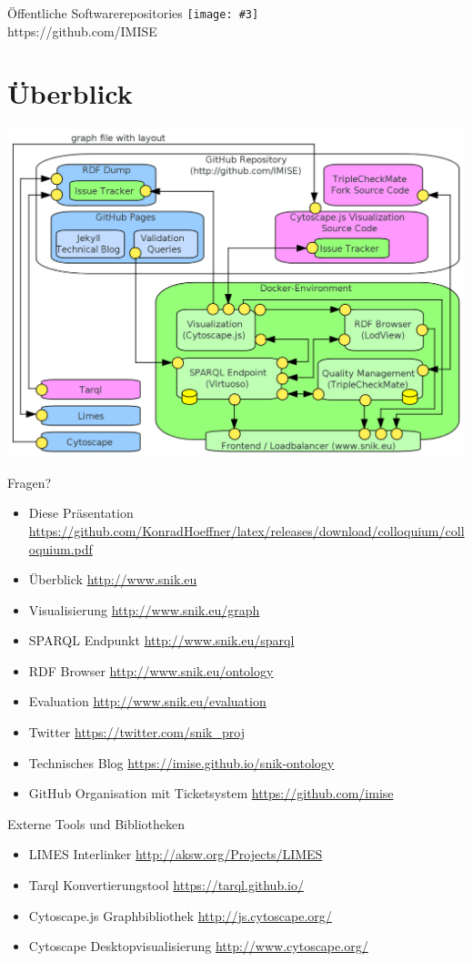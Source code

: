 \documentclass[aspectratio=43]{beamer}
\newcommand{\imageslide}[3][]
{
\begin{frame}{#2}
\centering\texttt{[image: \#3]}
\\#1
\end{frame}
}
\begin{document}
\imageslide[https://github.com/IMISE]{Öffentliche Softwarerepositories}{img/github.png}

\section{Überblick}

\begin{frame}
\includegraphics[width=\textwidth]{img/architecture.png}
\end{frame}

\begin{frame}[fragile]{Fragen?}
\begin{itemize}
\item Diese Präsentation \url{https://github.com/KonradHoeffner/latex/releases/download/colloquium/colloquium.pdf}
\vspace{0.5em}%
\item Überblick \url{http://www.snik.eu}
\item Visualisierung \url{http://www.snik.eu/graph}
\item SPARQL Endpunkt \url{http://www.snik.eu/sparql}
\item RDF Browser \url{http://www.snik.eu/ontology}
\item Evaluation \url{http://www.snik.eu/evaluation}
\item Twitter \url{https://twitter.com/snik\_proj}
\item Technisches Blog \url{https://imise.github.io/snik-ontology}
\item GitHub Organisation mit Ticketsystem \url{https://github.com/imise}
\end{itemize}
\end{frame}

\begin{frame}[fragile]{Externe Tools und Bibliotheken}
\begin{itemize}
\item LIMES Interlinker \url{http://aksw.org/Projects/LIMES}
\item Tarql Konvertierungstool \url{https://tarql.github.io/}
\item Cytoscape.js Graphbibliothek \url{http://js.cytoscape.org/}
\item Cytoscape Desktopvisualisierung \url{http://www.cytoscape.org/}
\end{itemize}
\end{frame}
\end{document}
